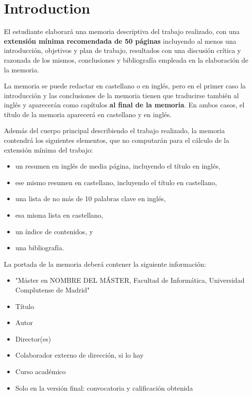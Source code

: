 \chapter{Introduction}
\label{cap:introduccion}



El estudiante elaborará una memoria descriptiva del trabajo realizado, con una \textbf{extensión mínima recomendada de 50 páginas} incluyendo al menos una introducción, objetivos y plan de trabajo, resultados con una discusión crítica y razonada de los mismos, conclusiones y bibliografía empleada en la elaboración de la memoria.

La memoria se puede redactar en castellano o en inglés, pero en el primer caso la introducción y las conclusiones de la memoria tienen que traducirse también al inglés y aparecerán como capítulos \textbf{al final de la memoria}. En ambos casos, el título de la memoria aparecerá en castellano y en inglés.

Además del cuerpo principal describiendo el trabajo realizado, la memoria contendrá los siguientes elementos, que no computarán para el cálculo de la extensión mínima del trabajo:

\begin{itemize}
\item un resumen en inglés de media página, incluyendo el título en inglés,
\item ese mismo resumen en castellano, incluyendo el título en castellano,
\item una lista de no más de 10 palabras clave en inglés,
\item esa misma lista en castellano,
\item un índice de contenidos, y
\item una bibliografía.
\end{itemize}

La portada de la memoria deberá contener la siguiente información:

\begin{itemize}
\item "Máster en NOMBRE DEL MÁSTER, Facultad de Informática, Universidad Complutense de Madrid"
\item Título
\item Autor
\item Director(es)
\item Colaborador externo de dirección, si lo hay
\item Curso académico
\item Solo en la versión final: convocatoria y calificación obtenida
\end{itemize}

